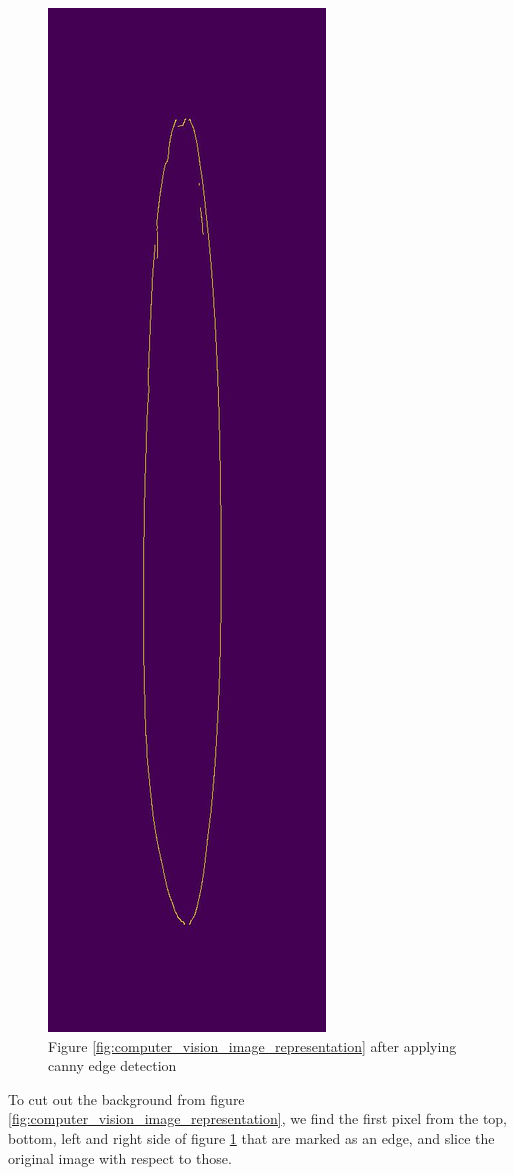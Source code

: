 \documentclass[11pt]{article}
\begin{document}
\begin{figure}[!h]
    \centering
    \includegraphics[scale=0.18]{figurer/computer_vision/report_hollow_33_4.jpg}
    \caption{Figure \ref{fig:computer_vision_image_representation} after applying canny edge detection}
    \label{fig:computer_vision_cany}
\end{figure}
To cut out the background from figure \ref{fig:computer_vision_image_representation}, we find the first pixel from the top, bottom, left and right side of figure \ref{fig:computer_vision_cany} that are marked as an edge, and slice the original image with respect to those.
\end{document}
